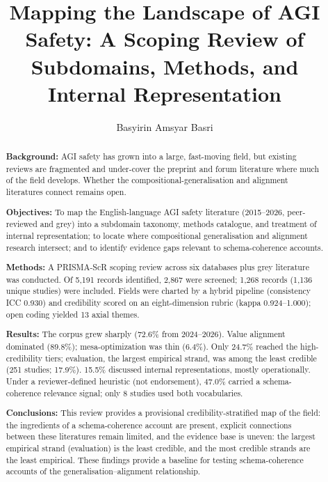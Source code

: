 

\title{Mapping the Landscape of AGI Safety: A Scoping Review of Subdomains, Methods, and Internal Representation}

\author{Basyirin Amsyar Basri}



\begin{abstract}
\textbf{Background:} AGI safety has grown into a large, fast-moving field, but existing reviews are fragmented and under-cover the preprint and forum literature where much of the field develops. Whether the compositional-generalisation and alignment literatures connect remains open.

\textbf{Objectives:} To map the English-language AGI safety literature (2015--2026, peer-reviewed and grey) into a subdomain taxonomy, methods catalogue, and treatment of internal representation; to locate where compositional generalisation and alignment research intersect; and to identify evidence gaps relevant to schema-coherence accounts.

\textbf{Methods:} A PRISMA-ScR scoping review across six databases plus grey literature was conducted. Of 5,191 records identified, 2,867 were screened; 1,268 records (1,136 unique studies) were included. Fields were charted by a hybrid pipeline (consistency ICC 0.930) and credibility scored on an eight-dimension rubric (kappa 0.924--1.000); open coding yielded 13 axial themes.

\textbf{Results:} The corpus grew sharply (72.6\% from 2024--2026). Value alignment dominated (89.8\%); mesa-optimization was thin (6.4\%). Only 24.7\% reached the high-credibility tiers; evaluation, the largest empirical strand, was among the least credible (251 studies; 17.9\%). 15.5\% discussed internal representations, mostly operationally. Under a reviewer-defined heuristic (not endorsement), 47.0\% carried a schema-coherence relevance signal; only 8 studies used both vocabularies.

\textbf{Conclusions:} This review provides a provisional credibility-stratified map of the field: the ingredients of a schema-coherence account are present, explicit connections between these literatures remain limited, and the evidence base is uneven: the largest empirical strand (evaluation) is the least credible, and the most credible strands are the least empirical. These findings provide a baseline for testing schema-coherence accounts of the generalisation--alignment relationship.
\end{abstract}

